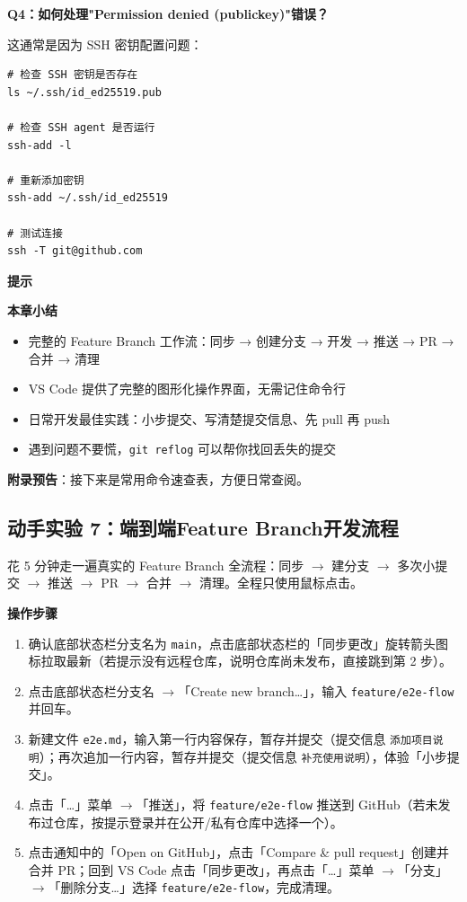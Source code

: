 \documentclass[12pt,a4paper,openany]{ctexbook}
\newenvironment{tipbox}{%
  \medskip
  \noindent\textbf{\faLightbulb\; 提示}
  \smallskip
}{%
  \medskip
}
\newenvironment{stepbox}{%
  \medskip
  \noindent\textbf{\faCogs\; 操作步骤}
  \smallskip
}{%
  \medskip
}
\begin{document}
\begin{infobox}
\textbf{Q4：如何处理"Permission denied (publickey)"错误？}

这通常是因为 SSH 密钥配置问题：

\begin{lstlisting}[style=shellinbox]
# 检查 SSH 密钥是否存在
ls ~/.ssh/id_ed25519.pub

# 检查 SSH agent 是否运行
ssh-add -l

# 重新添加密钥
ssh-add ~/.ssh/id_ed25519

# 测试连接
ssh -T git@github.com
\end{lstlisting}
\end{infobox}

\begin{tipbox}
\textbf{本章小结}
\begin{itemize}
  \item 完整的 Feature Branch 工作流：同步 → 创建分支 → 开发 → 推送 → PR → 合并 → 清理
  \item VS Code 提供了完整的图形化操作界面，无需记住命令行
  \item 日常开发最佳实践：小步提交、写清楚提交信息、先 pull 再 push
  \item 遇到问题不要慌，\texttt{git reflog} 可以帮你找回丢失的提交
\end{itemize}

\textbf{附录预告}：接下来是常用命令速查表，方便日常查阅。
\end{tipbox}

\subsection*{动手实验 7：端到端Feature Branch开发流程}

花 5 分钟走一遍真实的 Feature Branch 全流程：同步 $\to$ 建分支 $\to$ 多次小提交 $\to$ 推送 $\to$ PR $\to$ 合并 $\to$ 清理。全程只使用鼠标点击。

\begin{stepbox}
\begin{enumerate}[leftmargin=1.5em]
  \item 确认底部状态栏分支名为 \texttt{main}，点击底部状态栏的「同步更改」旋转箭头图标拉取最新（若提示没有远程仓库，说明仓库尚未发布，直接跳到第 2 步）。
  \item 点击底部状态栏分支名 $\to$「Create new branch…」，输入 \texttt{feature/e2e-flow} 并回车。
  \item 新建文件 \texttt{e2e.md}，输入第一行内容保存，暂存并提交（提交信息 \texttt{添加项目说明}）；再次追加一行内容，暂存并提交（提交信息 \texttt{补充使用说明}），体验「小步提交」。
  \item 点击「…」菜单 $\to$「推送」，将 \texttt{feature/e2e-flow} 推送到 GitHub（若未发布过仓库，按提示登录并在公开/私有仓库中选择一个）。
  \item 点击通知中的「Open on GitHub」，点击「Compare \& pull request」创建并合并 PR；回到 VS Code 点击「同步更改」，再点击「…」菜单 $\to$「分支」$\to$「删除分支…」选择 \texttt{feature/e2e-flow}，完成清理。
\end{enumerate}
\end{stepbox}
\end{document}
